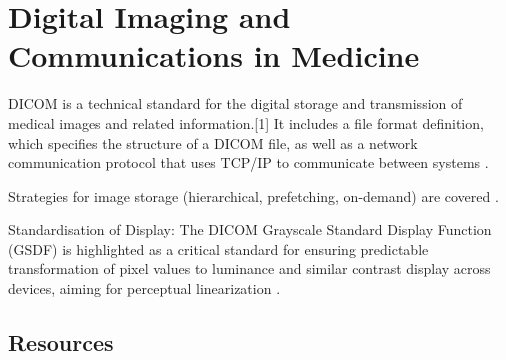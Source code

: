 \chapter{Digital Imaging and Communications in Medicine}

DICOM is a technical standard for the digital storage and transmission
of medical images and related information.[1] It includes a file
format definition, which specifies the structure of a DICOM file, as
well as a network communication protocol that uses TCP/IP to
communicate between systems \cite{wikipedia2025DICOM}.

Strategies for image storage (hierarchical, prefetching, on-demand)
are covered \cite{bushberg2011essential}.

Standardisation of Display: The DICOM Grayscale Standard Display Function (GSDF) is highlighted as a critical standard for ensuring predictable transformation of pixel values to luminance and similar contrast display across devices, aiming for perceptual linearization \cite{bushberg2011essential}.

\section{Resources}


